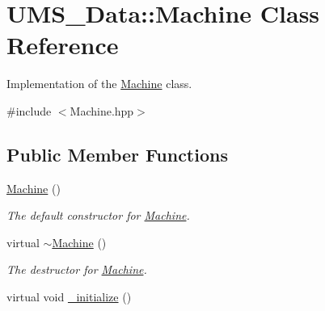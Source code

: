 \hypertarget{classUMS__Data_1_1Machine}{
\section{UMS\_\-Data::Machine Class Reference}
\label{classUMS__Data_1_1Machine}
}


Implementation of the \hyperlink{classUMS__Data_1_1Machine}{Machine} class.  




{\ttfamily \#include $<$Machine.hpp$>$}

\subsection*{Public Member Functions}
\begin{DoxyCompactItemize}
\item 
\hypertarget{classUMS__Data_1_1Machine_a95ff707c33d2e18fe6f9661c3a2605c9}{
\hyperlink{classUMS__Data_1_1Machine_a95ff707c33d2e18fe6f9661c3a2605c9}{Machine} ()}
\label{classUMS__Data_1_1Machine_a95ff707c33d2e18fe6f9661c3a2605c9}

\begin{DoxyCompactList}\small\item\em The default constructor for \hyperlink{classUMS__Data_1_1Machine}{Machine}. \item\end{DoxyCompactList}\item 
\hypertarget{classUMS__Data_1_1Machine_a844ea86afb17e92dd0efce13c7efcc78}{
virtual \hyperlink{classUMS__Data_1_1Machine_a844ea86afb17e92dd0efce13c7efcc78}{$\sim$Machine} ()}
\label{classUMS__Data_1_1Machine_a844ea86afb17e92dd0efce13c7efcc78}

\begin{DoxyCompactList}\small\item\em The destructor for \hyperlink{classUMS__Data_1_1Machine}{Machine}. \item\end{DoxyCompactList}\item 
\hypertarget{classUMS__Data_1_1Machine_a5010a8c048fffc170a992623f988438f}{
virtual void \hyperlink{classUMS__Data_1_1Machine_a5010a8c048fffc170a992623f988438f}{\_\-initialize} ()}
\label{classUMS__Data_1_1Machine_a5010a8c048fffc170a992623f988438f}


\end{DoxyCompactItemize}
